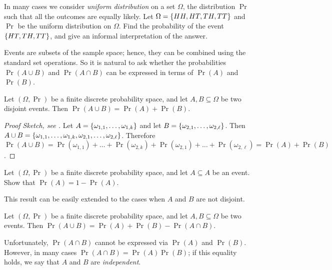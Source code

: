 \begin{exercise}
  In many cases we consider \emph{uniform distribution} on a set $\Omega$, the
  distribution $\Pr$ such that all the outcomes are equally likely.
  Let $\Omega = \set{HH, HT, TH, TT}$ and $\Pr$ be the uniform distribution on
  $\Omega$. Find the probability of the event $\set{HT, TH, TT}$, and give an
  informal interpretation of the answer.
\end{exercise}

Events are subsets of the sample space; hence, they can be combined using the
standard set operations. So it is natural to ask whether the probabilities
$\Pr(A \cup B)$ and $\Pr(A \cap B)$ can be expressed in terms of $\Pr(A)$ and
$\Pr(B)$.

\begin{theorem}
  Let $(\Omega, \Pr)$ be a finite discrete probability space, and let $A, B
  \subseteq \Omega$ be two disjoint events. Then 
  $\Pr(A \cup B) = \Pr(A) + \Pr(B)$.
\end{theorem}
\begin{proof}[Proof Sketch, see ]
  Let $A = \set{\omega_{1, 1}, \dots, \omega_{1, k}}$ and 
  let $B = \set{\omega_{2, 1}, \dots, \omega_{2, \ell}}$. 
  Then $A \cup B = \set{\omega_{1, 1}, \dots, \omega_{1, k}, 
    \omega_{2, 1}, \dots, \omega_{2, \ell}}$.
  Therefore $\Pr(A \cup B) = 
    \Pr(\omega_{1, 1}) + \dots + \Pr(\omega_{2, k}) +
    \Pr(\omega_{2, 1}) + \dots + \Pr(\omega_{2, \ell}) = \Pr(A) + \Pr(B)$.
\end{proof}

\begin{exercise}
  Let $(\Omega, \Pr)$ be a finite discrete probability space, and let $A
  \subseteq A$ be an event. Show that $\Pr(A) = 1 - \Pr(A)$.
\end{exercise}

This result can be easily extended to the cases when $A$ and $B$ are not
disjoint.
\begin{corollary}
\label{corollary:inclusion-exclustion-probability}
  Let $(\Omega, \Pr)$ be a finite discrete probability space, and let $A, B
  \subseteq \Omega$ be two events. Then 
  $\Pr(A \cup B) = \Pr(A) + \Pr(B) - \Pr(A \cap B)$.
\end{corollary}

Unfortunately, $\Pr(A \cap B)$ cannot be expressed via $\Pr(A)$ and $\Pr(B)$.
However, in many cases $\Pr(A \cap B) = \Pr(A) \Pr(B)$; if this equality holds,
we say that $A$ and $B$ are \emph{independent}.

